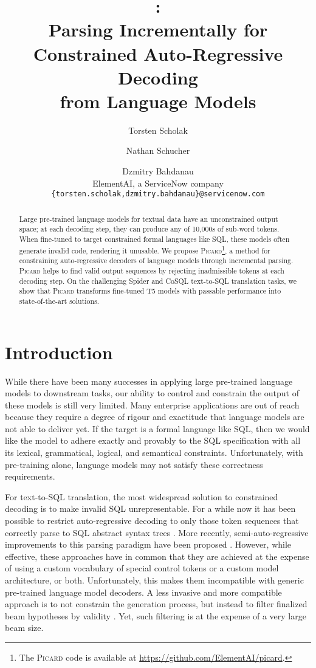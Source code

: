 \documentclass[11pt]{article}
\title{\Picard{}:
\\ Parsing Incrementally for Constrained Auto-Regressive Decoding
\\ from Language Models}
\author{Torsten Scholak \and
Nathan Schucher \and
Dzmitry Bahdanau \\
ElementAI, a ServiceNow company \\
\texttt{\{torsten.scholak,dzmitry.bahdanau\}@servicenow.com}}
\newcommand{\Picard}{\textsc{Picard}}
\newcommand{\texttosql}{text-to-SQL}
\begin{document}
\maketitle
\begin{abstract}
Large pre-trained language models for textual data have
an unconstrained output space;
at each decoding step,
they can produce any of 10,000s of sub-word tokens.
When fine-tuned to target constrained formal languages like SQL,
these models often generate invalid code, rendering it unusable.
We propose \Picard{}\footnote{The \Picard{} code is available at
\url{https://github.com/ElementAI/picard}.},
a method for constraining auto-regressive decoders of language models
through incremental parsing.
\Picard{} helps to find valid output sequences by rejecting inadmissible tokens
at each decoding step.
On the challenging Spider and CoSQL \texttosql{} translation tasks,
we show that \Picard{} transforms fine-tuned T5 models
with passable performance into state-of-the-art solutions.
\end{abstract}

\section{Introduction}

While there have been many successes in applying large pre-trained language models
to downstream tasks,
our ability to control and constrain the output of these models is still very limited.
Many enterprise applications are out of reach
because they require a degree of rigour and exactitude that
language models are not able to deliver yet.
If the target is a formal language like SQL,
then we would like the model to adhere exactly and provably to the SQL specification
with all its lexical, grammatical, logical, and semantical constraints.
Unfortunately, with pre-training alone, language models may not satisfy
these correctness requirements.

For \texttosql{} translation,
the most widespread solution to constrained decoding
is to make invalid SQL unrepresentable.
For a while now
it has been possible to restrict auto-regressive decoding to only those token sequences
that correctly parse to SQL abstract syntax trees
\citep{Yin_2018,lin2019grammarbased,Wang_2020}.
More recently,
semi-auto-regressive improvements to this parsing paradigm
have been proposed \citep{rubin2020smbop}.
However, while effective,
these approaches have in common that they are achieved at the expense of
using a custom vocabulary of special control tokens
or a custom model architecture, or both.
Unfortunately,
this makes them incompatible with generic pre-trained language model decoders.
A less invasive and more compatible approach is
to not constrain the generation process,
but instead to filter finalized beam hypotheses by validity
\citep{suhr-etal-2020-exploring,Lin_2020}.
Yet, such filtering is at the expense of a very large beam size.
\end{document}
